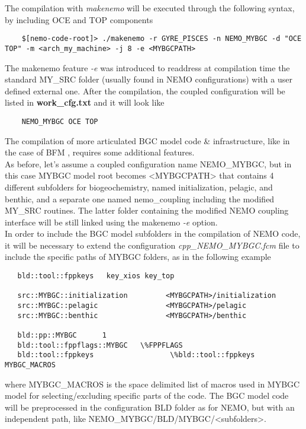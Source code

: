 \documentclass[../main/TOP_manual]{subfiles}
\begin{document}
The compilation with \textit{makenemo} will be executed through the following syntax, by including OCE and TOP components

\begin{verbatim}
    $[nemo-code-root]> ./makenemo -r GYRE_PISCES -n NEMO_MYBGC -d "OCE TOP" -m <arch_my_machine> -j 8 -e <MYBGCPATH>
\end{verbatim}

The makenemo feature \textit{-e} was introduced to readdress at compilation time the standard MY\_SRC folder (usually found in NEMO configurations) with a user defined external one.
After the compilation, the coupled configuration will be listed in \textbf{work\_cfg.txt} and it will look like

\begin{verbatim}
    NEMO_MYBGC OCE TOP
\end{verbatim}

The compilation of more articulated BGC model code \& infrastructure, like in the case of BFM \citep{bfm_nemo_coupling}, requires some additional features. \\

As before, let's assume a coupled configuration name NEMO\_MYBGC, but in this case MYBGC model root becomes <MYBGCPATH> that contains 4 different subfolders for biogeochemistry, named initialization, pelagic, and benthic, and a separate one named nemo\_coupling including the modified MY\_SRC routines. The latter folder containing the modified NEMO coupling interface will be still linked using the makenemo \textit{-e} option. \\

In order to include the BGC model subfolders in the compilation of NEMO code, it will be necessary to extend the configuration \textit{cpp\_NEMO\_MYBGC.fcm} file to include the specific paths of MYBGC folders, as in the following example

\begin{verbatim}
   bld::tool::fppkeys   key_xios key_top

   src::MYBGC::initialization         <MYBGCPATH>/initialization
   src::MYBGC::pelagic                <MYBGCPATH>/pelagic
   src::MYBGC::benthic                <MYBGCPATH>/benthic

   bld::pp::MYBGC      1
   bld::tool::fppflags::MYBGC   \%FPPFLAGS
   bld::tool::fppkeys                  \%bld::tool::fppkeys MYBGC_MACROS
\end{verbatim}

where MYBGC\_MACROS is the space delimited list of macros used in MYBGC model for selecting/excluding specific parts of the code. The BGC model code will be preprocessed in the configuration BLD folder as for NEMO, but with an independent path, like NEMO\_MYBGC/BLD/MYBGC/<subfolders>.\\
\end{document}
